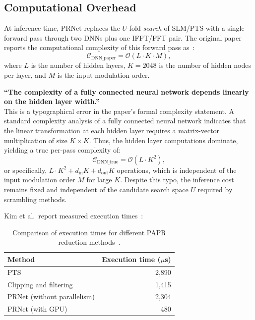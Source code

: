 \subsection{Computational Overhead}

At inference time, PRNet replaces the $U$-fold \emph{search} of SLM/PTS with a single forward pass through two DNNs plus one IFFT/FFT pair.
The original paper reports the computational complexity of this forward pass as~\cite{kim2017novel}:
\begin{equation*}
    \mathcal{C}_{\mathrm{DNN\_paper}}
    = \mathcal{O}(L \cdot K \cdot M),
\end{equation*}
where $L$ is the number of hidden layers, $K = 2048$ is the number of hidden nodes per layer, and $M$ is the input modulation order.

\begin{misconception}
    \textbf{``The complexity of a fully connected neural network depends linearly on the hidden layer width.''} \\
    This is a typographical error in the paper's formal complexity statement. A standard complexity analysis of a fully connected neural network indicates that the linear transformation at each hidden layer requires a matrix-vector multiplication of size $K \times K$. Thus, the hidden layer computations dominate, yielding a true per-pass complexity of:
    \begin{equation*}
        \mathcal{C}_{\mathrm{DNN\_true}} = \mathcal{O}(L \cdot K^2),
    \end{equation*}
    or specifically, $L \cdot K^2 + d_{\mathrm{in}} K + d_{\mathrm{out}} K$ operations, which is independent of the input modulation order $M$ for large $K$. Despite this typo, the inference cost remains fixed and independent of the candidate search space $U$ required by scrambling methods.
\end{misconception}

Kim et al.\ report measured execution times~\cite{kim2017novel}:

\begin{table}[H]
    \centering
    \caption{Comparison of execution times for different PAPR reduction methods~\cite{kim2017novel}.}
    \label{tab:prnet_timing}
    \begin{tabular}{@{} l r @{}}
        \toprule
        \textbf{Method}             & \textbf{Execution time ($\mu$s)} \\
        \midrule
        PTS                         & 2{,}890                          \\
        Clipping and filtering      & 1{,}415                          \\
        PRNet (without parallelism) & 2{,}304                          \\
        PRNet (with GPU)            & 480                              \\
        \bottomrule
    \end{tabular}
\end{table}

